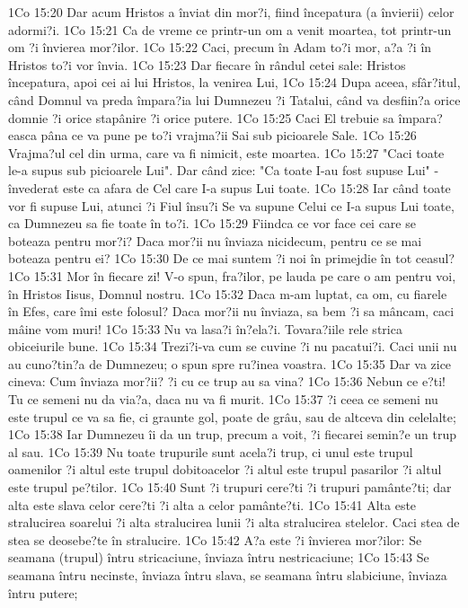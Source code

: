 1Co 15:20  Dar acum Hristos a înviat din mor?i, fiind începatura (a învierii) celor adormi?i.
1Co 15:21  Ca de vreme ce printr-un om a venit moartea, tot printr-un om ?i învierea mor?ilor.
1Co 15:22  Caci, precum în Adam to?i mor, a?a ?i în Hristos to?i vor învia.
1Co 15:23  Dar fiecare în rândul cetei sale: Hristos începatura, apoi cei ai lui Hristos, la venirea Lui,
1Co 15:24  Dupa aceea, sfâr?itul, când Domnul va preda împara?ia lui Dumnezeu ?i Tatalui, când va desfiin?a orice domnie ?i orice stapânire ?i orice putere.
1Co 15:25  Caci El trebuie sa împara?easca pâna ce va pune pe to?i vrajma?ii Sai sub picioarele Sale.
1Co 15:26  Vrajma?ul cel din urma, care va fi nimicit, este moartea.
1Co 15:27  "Caci toate le-a supus sub picioarele Lui". Dar când zice: "Ca toate I-au fost supuse Lui" - învederat este ca afara de Cel care I-a supus Lui toate.
1Co 15:28  Iar când toate vor fi supuse Lui, atunci ?i Fiul însu?i Se va supune Celui ce I-a supus Lui toate, ca Dumnezeu sa fie toate în to?i.
1Co 15:29  Fiindca ce vor face cei care se boteaza pentru mor?i? Daca mor?ii nu înviaza nicidecum, pentru ce se mai boteaza pentru ei?
1Co 15:30  De ce mai suntem ?i noi în primejdie în tot ceasul?
1Co 15:31  Mor în fiecare zi! V-o spun, fra?ilor, pe lauda pe care o am pentru voi, în Hristos Iisus, Domnul nostru.
1Co 15:32  Daca m-am luptat, ca om, cu fiarele în Efes, care îmi este folosul? Daca mor?ii nu înviaza, sa bem ?i sa mâncam, caci mâine vom muri!
1Co 15:33  Nu va lasa?i în?ela?i. Tovara?iile rele strica obiceiurile bune.
1Co 15:34  Trezi?i-va cum se cuvine ?i nu pacatui?i. Caci unii nu au cuno?tin?a de Dumnezeu; o spun spre ru?inea voastra.
1Co 15:35  Dar va zice cineva: Cum înviaza mor?ii? ?i cu ce trup au sa vina?
1Co 15:36  Nebun ce e?ti! Tu ce semeni nu da via?a, daca nu va fi murit.
1Co 15:37  ?i ceea ce semeni nu este trupul ce va sa fie, ci graunte gol, poate de grâu, sau de altceva din celelalte;
1Co 15:38  Iar Dumnezeu îi da un trup, precum a voit, ?i fiecarei semin?e un trup al sau.
1Co 15:39  Nu toate trupurile sunt acela?i trup, ci unul este trupul oamenilor ?i altul este trupul dobitoacelor ?i altul este trupul pasarilor ?i altul este trupul pe?tilor.
1Co 15:40  Sunt ?i trupuri cere?ti ?i trupuri pamânte?ti; dar alta este slava celor cere?ti ?i alta a celor pamânte?ti.
1Co 15:41  Alta este stralucirea soarelui ?i alta stralucirea lunii ?i alta stralucirea stelelor. Caci stea de stea se deosebe?te în stralucire.
1Co 15:42  A?a este ?i învierea mor?ilor: Se seamana (trupul) întru stricaciune, înviaza întru nestricaciune;
1Co 15:43  Se seamana întru necinste, înviaza întru slava, se seamana întru slabiciune, înviaza întru putere;
